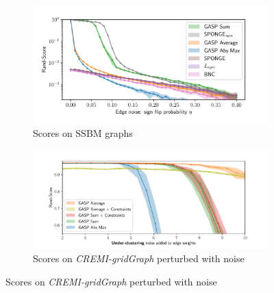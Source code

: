 
\captionsetup[subfigure]{justification=centering, singlelinecheck=off}
\begin{figure}[t]
\centering
    \begin{subfigure}[t]{0.47 \textwidth}
        \centering
        \includegraphics[width=\textwidth,trim=0.25in 0.in 0.5in 0.in,clip]{./figs/SSBM_experiments.pdf}
        \caption{Scores on SSBM graphs}
    \end{subfigure} \hfill
    \begin{subfigure}[t]{0.47 \textwidth}
        \centering
        \includegraphics[width=\textwidth,trim=0.53in 0.1in 0.65in 0.45in,clip]{./figs/noise_plots/under_segment_plots_1.pdf}
        \caption{Scores on \emph{CREMI-gridGraph} perturbed with noise}
    \end{subfigure}


\end{figure}
